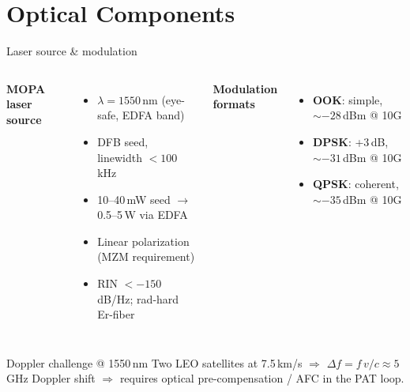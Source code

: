 \documentclass{KAIST-slide}
\newcommand{\si}{\item[\textcolor{islcorange}{\ding{167}}]}    %
\newcommand{\key}[1]{\textcolor{islcblue}{\textbf{#1}}}        %
\begin{document}
\section{Optical Components}

\begin{frame}[allowframebreaks=1.2]{Laser source \& modulation}
    \begin{columns}[T]
        \textbf{MOPA laser source}
        \begin{itemize}\footnotesize
            \si $\lambda = 1550$\,nm (eye-safe, EDFA band)
            \si DFB seed, linewidth $<100$\,kHz
            \si 10--40\,mW seed $\to$ 0.5--5\,W via EDFA
            \si Linear polarization (MZM requirement)
            \si RIN $< -150$\,dB/Hz; rad-hard Er-fiber
        \end{itemize}
        \textbf{Modulation formats}~\cite{caplan2007laser}
        \begin{itemize}\footnotesize
            \si \key{OOK}: simple, $\sim-28$\,dBm @ 10G
            \si \key{DPSK}: +3\,dB, $\sim-31$\,dBm @ 10G
            \si \key{QPSK}: coherent, $\sim-35$\,dBm @ 10G
        \end{itemize}
    \end{columns}
    \vspace{2mm}
    \begin{block}{Doppler challenge @ 1550\,nm}
    Two LEO satellites at 7.5\,km/s $\Rightarrow$ $\Delta f = f\,v/c \approx 5$\,GHz Doppler shift $\Rightarrow$ requires optical pre-compensation / AFC in the PAT loop.
    \end{block}
\end{frame}
\end{document}
